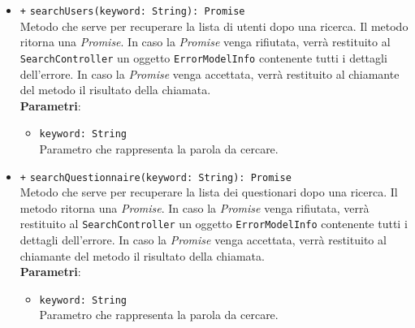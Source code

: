\begin{itemize}
\begin{itemize}
		\item \texttt{+} \texttt{searchUsers(keyword: String): Promise} \\Metodo che serve per recuperare la lista di utenti dopo una ricerca. Il metodo ritorna una \textit{Promise}. In caso la \textit{Promise} venga rifiutata, verrà restituito al \texttt{SearchController} un oggetto \texttt{ErrorModelInfo} contenente tutti i dettagli dell'errore. In caso la \textit{Promise} venga accettata, verrà restituito al chiamante del metodo il risultato della chiamata.\\
		\textbf{Parametri}:
		\begin{itemize}
			\item \texttt{keyword: String} \\ Parametro che rappresenta la parola da cercare.
		\end{itemize}
		\item \texttt{+} \texttt{searchQuestionnaire(keyword: String): Promise} \\Metodo che serve per recuperare la lista dei questionari dopo una ricerca. Il metodo ritorna una \textit{Promise}. In caso la \textit{Promise} venga rifiutata, verrà restituito al \texttt{SearchController} un oggetto \texttt{ErrorModelInfo} contenente tutti i dettagli dell'errore. In caso la \textit{Promise} venga accettata, verrà restituito al chiamante del metodo il risultato della chiamata.\\
		\textbf{Parametri}:
		\begin{itemize}
			\item \texttt{keyword: String} \\ Parametro che rappresenta la parola da cercare.
		\end{itemize}
	\end{itemize}
\end{itemize}